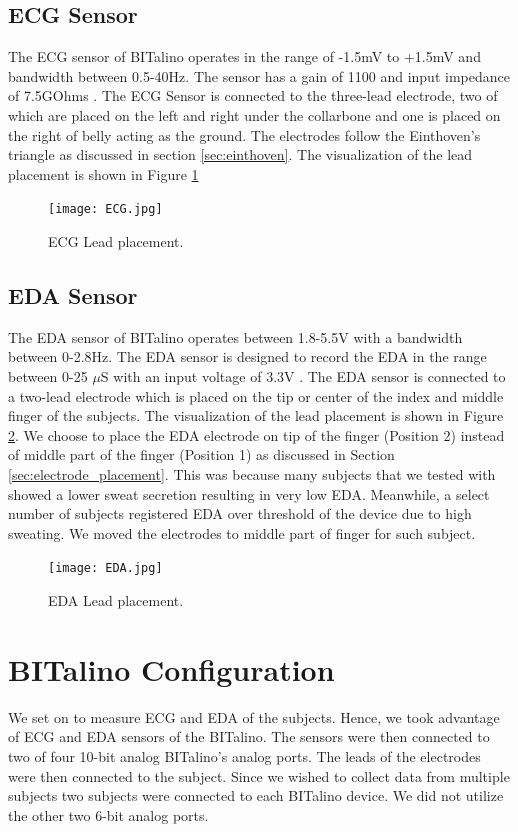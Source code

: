 \subsection{ECG Sensor}
The ECG sensor of BITalino operates in the range of -1.5mV to +1.5mV and bandwidth between 0.5-40Hz. The sensor has a gain of 1100 and input impedance of 7.5GOhms \cite{ecg_datasheet}. The ECG Sensor is connected to the three-lead electrode, two of which are placed on the left and right under the collarbone and one is placed on the right of belly acting as the ground. The electrodes follow the Einthoven's triangle as discussed in section \ref{sec:einthoven}. The visualization of the lead placement is shown in Figure \ref{fig:ecg_lead_placement}
\begin{figure}
\centering
\texttt{[image: ECG.jpg]}
\caption{ECG Lead placement.}
\label{fig:ecg_lead_placement}
\end{figure}
\subsection{EDA Sensor}
\label{sec:eda_sensor}
The EDA sensor of BITalino operates between 1.8-5.5V with a bandwidth between 0-2.8Hz. The EDA sensor is designed to record the EDA in the range between 0-25 $\mu$S with an input voltage of 3.3V \cite{eda_datasheet}. The EDA sensor is connected to a two-lead electrode which is placed on the tip or center of the index and middle finger of the subjects. The visualization of the lead placement is shown in Figure \ref{fig:eda_lead_placement}. We choose to place the EDA electrode on tip of the finger (Position 2) instead of middle part of the finger (Position 1) as discussed in Section \ref{sec:electrode_placement}. This was because many subjects that we tested with showed a lower sweat secretion resulting in very low EDA. Meanwhile, a select number of subjects registered EDA over threshold of the device due to high sweating. We moved the electrodes to middle part of finger for such subject. 
\begin{figure}
\centering
\texttt{[image: EDA.jpg]}
\caption{EDA Lead placement.}
\label{fig:eda_lead_placement}
\end{figure}

\section{BITalino Configuration}
We set on to measure ECG and EDA of the subjects. Hence, we took advantage of ECG and EDA sensors of the BITalino. The sensors were then connected to two of four 10-bit analog BITalino’s analog ports. The leads of the electrodes were then connected to the subject. Since we wished to collect data from multiple subjects two subjects were connected to each BITalino device. We did not utilize the other two 6-bit analog ports. 
